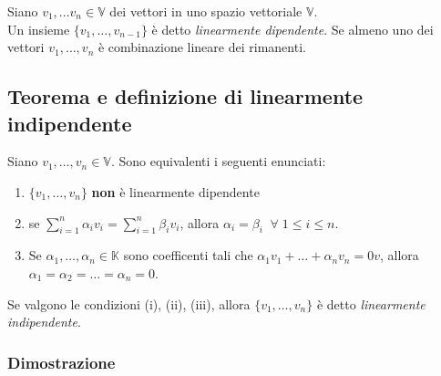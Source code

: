 \documentclass[12pt]{article}
\begin{document}
Siano $v_1, \dots v_n \in \mathbb{V}$ dei vettori in uno spazio vettoriale $\mathbb{V}$. \\
Un insieme $\{v_1, \dots, v_{n-1}\}$ è detto \textit{linearmente dipendente}. Se almeno uno dei vettori $v_1, \dots, v_n$ è combinazione lineare dei rimanenti.

\subsection{Teorema e definizione di linearmente indipendente}

Siano $v_1, \dots, v_n \in \mathbb{V}$. Sono equivalenti i seguenti enunciati:

\begin{enumerate}
    \item $\{v_1, \dots, v_n\}$ \textbf{non} è linearmente dipendente
    \item se $\sum^n_{i=1}\alpha_iv_i = \sum^n_{i=1}\beta_iv_i$, allora $\alpha_i = \beta_i \; \; \forall \; 1 \le i \le n$.
    \item Se $\alpha_1, \dots, \alpha_n \in \mathbb{K}$ sono coefficenti tali che $\alpha_1v_1 + \dots + \alpha_nv_n = 0v$, allora $\alpha_1 = \alpha_2 = \dots = \alpha_n = 0$.
\end{enumerate}
Se valgono le condizioni (i), (ii), (iii), allora $\{v_1, \dots, v_n\}$ è detto \textit{linearmente indipendente}.

\subsubsection{Dimostrazione}
\end{document}
